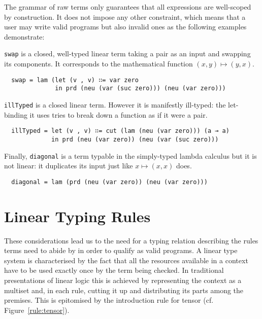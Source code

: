 \documentclass[a4paper,UKenglish]{lipics-v2016}
\begin{document}

The grammar of raw terms only guarantees that all expressions are
well-scoped by construction. It does not impose any other constraint,
which means that a user may write valid programs but also invalid
ones as the following examples demonstrate:

\begin{example}\label{example:swap}
\texttt{swap} is a closed, well-typed linear term taking a pair as
an input and swapping its components. It corresponds to the mathematical
function $(x, y) \mapsto (y, x)$.
\begin{lstlisting}
  swap = lam (let (v , v) ∷= var zero
              in prd (neu (var (suc zero))) (neu (var zero)))
\end{lstlisting}
\end{example}

\begin{example}\label{example:illTyped}
\texttt{illTyped} is a closed linear term. However it is manifestly
ill-typed: the let-binding it uses tries to break down a function as
if it were a pair.
\begin{lstlisting}
  illTyped = let (v , v) ∷= cut (lam (neu (var zero))) (a ⊸ a)
             in prd (neu (var zero)) (neu (var (suc zero)))
\end{lstlisting}
\end{example}

\begin{example}\label{example:diagonal}
Finally, \texttt{diagonal} is a term typable in the simply-typed
lambda calculus but it is not linear: it duplicates its input just
like $x \mapsto (x, x)$ does.
\begin{lstlisting}
  diagonal = lam (prd (neu (var zero)) (neu (var zero)))
\end{lstlisting}
\end{example}

\section{Linear Typing Rules}

These considerations lead us to the need for a typing relation
describing the rules terms need to abide by in order to qualify
as valid programs. A linear type system is characterised by the
fact that all the resources available in a context have to be
used exactly once by the term being checked. In traditional
presentations of linear logic this is achieved by representing
the context as a multiset and, in each rule, cutting it up and
distributing its parts among the premises. This is epitomised
by the introduction rule for tensor (cf. Figure~\ref{rule:tensor}).
\end{document}
